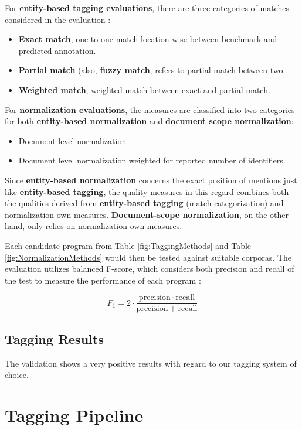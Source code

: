 For \textbf{entity-based tagging evaluations}, there are three categories of matches considered in the evaluation \citep{ofner2015evaluation}:

\begin{itemize}
\item \textbf{Exact match}, one-to-one match location-wise between benchmark and predicted annotation.
\item \textbf{Partial match} (also, \textbf{fuzzy match}, refers to partial match between two.
\item \textbf{Weighted match}, weighted match between exact and partial match.
\end{itemize}

For \textbf{normalization evaluations}, the measures are classified into two categories for both \textbf{entity-based normalization} and \textbf{document scope normalization}:

\begin{itemize}
\item Document level normalization
\item Document level normalization weighted for reported number of identifiers.
\end{itemize}

Since \textbf{entity-based normalization} concerns the exact position of mentions just like \textbf{entity-based tagging}, the quality measures in this regard combines both the qualities derived from \textbf{entity-based tagging} (match categorization) and normalization-own measures. \textbf{Document-scope normalization}, on the other hand, only relies on normalization-own measures.

Each candidate program from Table \ref{fig:TaggingMethods} and Table \ref{fig:NormalizationMethods} would then be tested against suitable corporas. The evaluation utilizes balanced F-score, which considers both precision and recall of the test to measure the performance of each program \citep{salton1986introduction}:

$$
F_1 = 2 \cdot \frac{\mathrm{precision} \cdot \mathrm{recall}}{\mathrm{precision} + \mathrm{recall}}
$$

\subsection{Tagging Results}

The validation shows a very positive results with regard to our tagging system of choice. 

\section{Tagging Pipeline}


